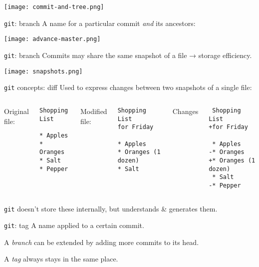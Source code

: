 \documentclass[12pt,aspectratio=169]{beamer}
\begin{document}
\begin{frame}[plain]
  \centering \texttt{[image: commit-and-tree.png]}
\end{frame}

\begin{frame}{\texttt{git}: branch} \large
  A name for a particular commit \emph{and} its ancestors:

  \centering
  \texttt{[image: advance-master.png]}
\end{frame}

\begin{frame}{\texttt{git}: branch}
  Commits may share the same snapshot of a file → storage efficiency.

  \texttt{[image: snapshots.png]}
\end{frame}

\begin{frame}[fragile]{\texttt{git} concepts: diff}
  Used to express changes between two snapshots of a single file:

  \bigskip
  \begin{columns}[t]
    \column{0.3\paperwidth}
    Original file:

    \begin{verbatim}
Shopping List

* Apples
* Oranges
* Salt
* Pepper
\end{verbatim}

    \column{0.3\paperwidth}
    Modified file:

    \begin{verbatim}
Shopping List
for Friday

* Apples
* Oranges (1 dozen)
* Salt
\end{verbatim}

    \column{0.3\paperwidth}
    Changes

    \begin{verbatim}
 Shopping List
+for Friday

 * Apples
-* Oranges
+* Oranges (1 dozen)
 * Salt
-* Pepper
\end{verbatim}

  \end{columns}

  \texttt{git} doesn't store these internally, but understands \& generates them.
\end{frame}

\begin{frame}{\texttt{git}: tag} \Large
  A name applied to a certain commit.

  \bigskip
  A \emph{branch} can be extended by adding more commits to its head.

  A \emph{tag} always stays in the same place.
\end{frame}
\end{document}
